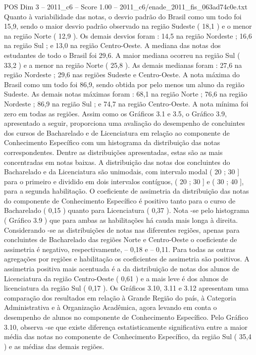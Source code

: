 \begin{textsample}{POS Dim 3 – 2011\_c6 – Score 1.00 – 2011\_c6/enade\_2011\_fis\_063ad74c0e.txt}
Quanto à variabilidade das notas, o desvio padrão do Brasil como um todo foi 15,9, sendo o maior desvio padrão observado na região Sudeste ( 18,1 ) e o menor na região Norte ( 12,9 ).
Os demais desvios foram : 14,5 na região Nordeste ; 16,6 na região Sul ; e 13,0 na região Centro-Oeste.
A mediana das notas dos estudantes de todo o Brasil foi 29,6.
A maior mediana ocorreu na região Sul ( 33,2 ) e a menor na região Norte ( 25,8 ).
As demais medianas foram : 27,6 na região Nordeste ; 29,6 nas regiões Sudeste e Centro-Oeste.
A nota máxima do Brasil como um todo foi 86,9, sendo obtida por pelo menos um aluno da região Sudeste.
As demais notas máximas foram : 68,1 na região Norte ; 76,6 na região Nordeste ; 86,9 na região Sul ; e 74,7 na região Centro-Oeste.
A nota mínima foi zero em todas as regiões.
Assim como os Gráficos 3.1 e 3.5, o Gráfico 3.9, apresentado a seguir, proporciona uma avaliação do desempenho de concluintes dos cursos de Bacharelado e de Licenciatura em relação ao componente de Conhecimento Específico com um histograma da distribuição das notas correspondentes.
Dentre as distribuições apresentadas, estas são as mais concentradas em notas baixas.
A distribuição das notas dos concluintes do Bacharelado e da Licenciatura são unimodais, com intervalo modal ( 20 ; 30 ] para o primeiro e dividido em dois intervalos contíguos, ( 20 ; 30 ] e ( 30 ; 40 ], para a segunda habilitação.
O coeficiente de assimetria da distribuição das notas do componente de Conhecimento Específico é positivo tanto para o curso de Bacharelado ( 0,15 ) quanto para Licenciatura ( 0,37 ).
Nota -se pelo histograma ( Gráfico 3.9 ) que para ambas as habilitações há cauda mais longa à direita.
Considerando -se as distribuições de notas nas diferentes regiões, apenas para concluintes de Bacharelado das regiões Norte e Centro-Oeste o coeficiente de assimetria é negativo, respectivamente, – 0,18 e – 0,11.
Para todas as outras agregações por regiões e habilitação os coeficientes de assimetria são positivos.
A assimetria positiva mais acentuada é a da distribuição de notas dos alunos de Licenciatura da região Centro-Oeste ( 0,61 ) e a mais leve é dos alunos de licenciatura da região Sul ( 0,17 ).
Os Gráficos 3.10, 3.11 e 3.12 apresentam uma comparação dos resultados em relação à Grande Região do país, à Categoria Administrativa e à Organização Acadêmica, agora levando em conta o desempenho de alunos no componente de Conhecimento Específico.
Pelo Gráfico 3.10, observa -se que existe diferença estatisticamente significativa entre a maior média das notas no componente de Conhecimento Específico, da região Sul ( 35,4 ) e as médias das demais regiões.

\end{textsample}
